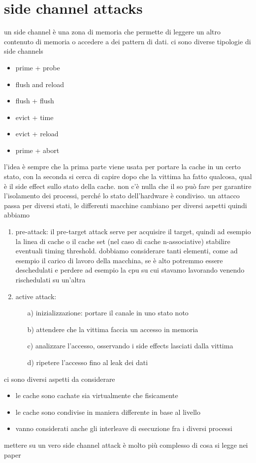\documentclass[12pt, oneside]{extbook} %
\begin{document}
\section{side channel attacks}
un side channel è una zona di memoria che permette di leggere un altro contenuto di memoria o accedere a dei pattern di dati. ci sono diverse tipologie di side channels
\begin{itemize}
\item prime + probe
\item flush and reload
\item flush + flush
\item evict + time
\item evict + reload
\item prime + abort
\end{itemize}
l'idea è sempre che la prima parte viene usata per portare la cache in un certo stato, con la seconda si cerca di capire dopo che la vittima ha fatto qualcosa, qual è il side effect sullo stato della cache. non c'è nulla che il so può fare per garantire l'isolamento dei processi, perché lo stato dell'hardware è condiviso. un attacco passa per diversi stati, le differenti macchine cambiano per diversi aspetti quindi abbiamo
\begin{enumerate}
\item pre-attack: il pre-target attack serve per acquisire il target, quindi ad esempio la linea di cache o il cache set (nel caso di cache n-associative) stabilire eventuali timing threshold. dobbiamo considerare tanti elementi, come ad esempio il carico di lavoro della macchina, se è alto potremmo essere deschedulati e perdere ad esempio la cpu su cui stavamo lavorando venendo rischedulati su un'altra
\item active attack:
\begin{itemize}
\item[a)] inizializzazione: portare il canale in uno stato noto
\item[b)] attendere che la vittima faccia un accesso in memoria
\item[c)] analizzare l'accesso, osservando i side effects lasciati dalla vittima
\item[d)] ripetere l'accesso fino al leak dei dati
\end{itemize}
\end{enumerate}
ci sono diversi aspetti da considerare
\begin{itemize}
\item le cache sono cachate sia virtualmente che fisicamente
\item le cache sono condivise in maniera differente in base al livello
\item vanno considerati anche gli interleave di esecuzione fra i diversi processi
\end{itemize}
mettere su un vero side channel attack è molto più complesso di cosa si legge nei paper
\end{document}
